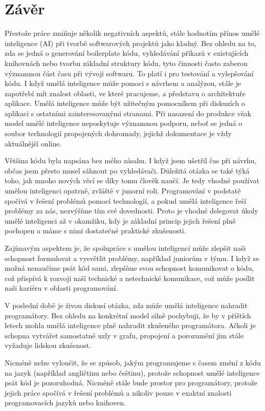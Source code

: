 \documentclass[FM,DP]{tulthesis}
\begin{document}
		
		\chapter{Závěr} 
		Přestože práce zmiňuje několik negativních aspektů, stále hodnotím přínos umělé inteligence (AI) při tvorbě softwarových projektů jako kladný. Bez ohledu na to, zda se jedná o generování boilerplate kódu, vyhledávání příkazů v existujících knihovnách nebo tvorbu základní struktury kódu, tyto činnosti často zaberou významnou část času při vývoji softwaru. To platí i pro testování a vylepšování kódu. I když umělá inteligence může pomoci s návrhem a analýzou, stále je zapotřebí mít znalost oblasti, ve které pracujeme, a představu o architektuře aplikace. Umělá inteligence může být užitečným pomocníkem při diskuzích o aplikaci s ostatními zainteresovanými stranami. Při nasazení do produkce však model umělé inteligence neposkytuje významnou podporu, neboť se jedná o soubor technologií propojených dohromady, jejichž dokumentace je vždy aktuálnější online.
		
		Většina kódu byla napsána bez mého zásahu. I když jsem ušetřil čas při návrhu, občas jsem přesto musel sáhnout po vyhledávači. Důležitá otázka se také týká toho, jak mnoho nových věcí se díky tomu člověk naučí. Je tedy vhodné používat umělou inteligenci opatrně, zvláště v junorní roli. Programování v podstatě spočívá v řešení problémů pomocí technologií, a pokud umělá inteligence řeší problémy za nás, nezvýšíme tím své dovednosti. Proto je vhodné delegovat úkoly umělé inteligenci až v okamžiku, kdy je základní princip jejich řešení plně pochopen a máme s nimi dostatečné praktické zkušenosti.
		
		Zajímavým aspektem je, že spolupráce s umělou inteligencí může zlepšit naši schopnost formulovat a vysvětlit problémy, například juniorům v týmu. I když se možná nenaučíme psát kód sami, zlepšíme svou schopnost komunikovat o kódu, což přispívá k rozvoji naší technické a netechnické komunikace, což může posílit naši kariéru v oblasti programování.
		
		V poslední době je živou diskusí otázka, zda může umělá inteligence nahradit programátory. Bez ohledu na konkrétní model silně pochybuji, že by v příštích letech mohla umělá inteligence plně nahradit zkušeného programátora. Ačkoli je schopna vytvářet samostatné uzly v grafu, propojení a porozumění jim stále vyžaduje lidskou zkušenost. 
		
		Nicméně nelze vyloučit, že se způsob, jakým programujeme s časem změní z kódu na jazyk (například angličtinu nebo češtinu), protože schopnost umělé inteligence psát kód je pozoruhodná. Nicméně stále bude prostor pro programátory, protože jejich práce spočívá v řešení problémů a nikoliv pouze v exaktní znalosti programovacích jazyků nebo knihoven.
		
		\printbibliography[title={Použitá literatura}] %
	
\end{document}
